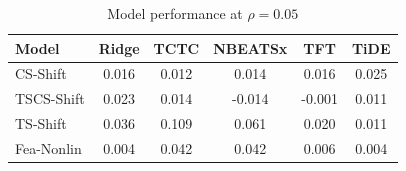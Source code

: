 \documentclass{article}
\begin{document}
\begin{table}[h]
    \centering
    \caption{Model performance at $\rho = 0.05$}
    \label{tab:model_performance}
    \begin{tabular}{lccccc}
\toprule
Model & Ridge & TCTC & NBEATSx & TFT & TiDE \\
\midrule
CS-Shift & {\cellcolor[HTML]{A1C0FF}} \color[HTML]{000000} 0.016 & {\cellcolor[HTML]{3B4CC0}} \color[HTML]{F1F1F1} 0.012 & {\cellcolor[HTML]{6B8DF0}} \color[HTML]{F1F1F1} 0.014 & {\cellcolor[HTML]{A1C0FF}} \color[HTML]{000000} 0.016 & {\cellcolor[HTML]{B40426}} \color[HTML]{F1F1F1} 0.025 \\
TSCS-Shift & {\cellcolor[HTML]{B40426}} \color[HTML]{F1F1F1} 0.023 & {\cellcolor[HTML]{F39778}} \color[HTML]{000000} 0.014 & {\cellcolor[HTML]{3B4CC0}} \color[HTML]{F1F1F1} -0.014 & {\cellcolor[HTML]{AFCAFC}} \color[HTML]{000000} -0.001 & {\cellcolor[HTML]{F7B599}} \color[HTML]{000000} 0.011 \\
TS-Shift & {\cellcolor[HTML]{8FB1FE}} \color[HTML]{000000} 0.036 & {\cellcolor[HTML]{B40426}} \color[HTML]{F1F1F1} 0.109 & {\cellcolor[HTML]{DFDBD9}} \color[HTML]{000000} 0.061 & {\cellcolor[HTML]{5673E0}} \color[HTML]{F1F1F1} 0.020 & {\cellcolor[HTML]{3B4CC0}} \color[HTML]{F1F1F1} 0.011 \\
Fea-Nonlin & {\cellcolor[HTML]{3B4CC0}} \color[HTML]{F1F1F1} 0.004 & {\cellcolor[HTML]{B40426}} \color[HTML]{F1F1F1} 0.042 & {\cellcolor[HTML]{B40426}} \color[HTML]{F1F1F1} 0.042 & {\cellcolor[HTML]{4A63D3}} \color[HTML]{F1F1F1} 0.006 & {\cellcolor[HTML]{3B4CC0}} \color[HTML]{F1F1F1} 0.004 \\
\bottomrule
\end{tabular}

    \end{table}
\end{document}
